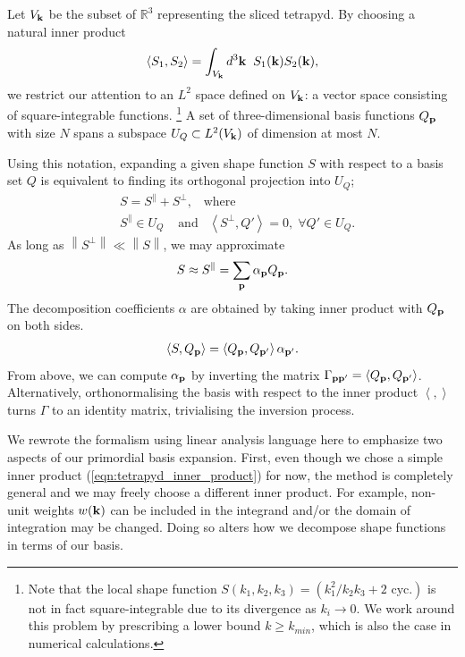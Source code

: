 Let $V_{\mathbf{k}}$ be the subset of $\mathbb{R}^3$ representing the sliced tetrapyd. By choosing a natural inner product
\begin{align}
	\left< S_1, S_2 \right> = \int_{V_{\mathbf{k}}} d^3\mathbf{k} \;\; S_1(\mathbf{k}) S_2(\mathbf{k}), \label{eqn:tetrapyd_inner_product}
\end{align}
we restrict our attention to an $L^2$ space defined on $V_{\mathbf{k}}$: a vector space consisting of square-integrable functions.
\footnote{Note that the local shape function $S(k_1,k_2,k_3) = (k_1^2 / k_2 k_3 + \text{2 cyc.})$ is not in fact square-integrable due to its divergence as $k_i \rightarrow 0$. We work around this problem by prescribing a lower bound $k \ge k_{min}$, which is also the case in numerical calculations.}
A set of three-dimensional basis functions $Q_{\mathbf{p}}$ with size $N$ spans a subspace $U_{Q} \subset L^2(V_{\mathbf{k}})$ of dimension at most $N$.

Using this notation, expanding a given shape function $S$ with respect to a basis set $Q$ is equivalent to finding its orthogonal projection into $U_{Q}$;
\begin{align}
	&S = S^{\parallel} + S^{\perp}, \;\;\;\text{where} \\
	&S^{\parallel} \in U_Q \;\;\;\;\text{and} \;\;\; \left< S^{\perp}, Q' \right> = 0, \; \forall Q' \in U_Q.
\end{align}
As long as $\left\| S^\perp \right\| \ll \left\| S \right\|$, we may approximate
\begin{align}
	S \approx S^\parallel = \sum_{\mathbf{p}} \alpha_{\mathbf{p}} Q_{\mathbf{p}}.  \label{eqn:primordial_basis_projection}
\end{align}
The decomposition coefficients $\alpha$ are obtained by taking inner product with $Q_{\mathbf{p}}$ on both sides.
\begin{align}
	\left< S, Q_\mathbf{p} \right> = \left< Q_\mathbf{p}, Q_{\mathbf{p}'} \right> \alpha_{\mathbf{p}'}. \label{eqn:primordial_basis_expansion_SQ_and_QQ}
\end{align}
From above, we can compute $\alpha_\mathbf{p}$ by inverting the matrix $\Gamma_{\mathbf{p} \mathbf{p}'} = \left< Q_\mathbf{p}, Q_{\mathbf{p}'} \right>$. Alternatively, orthonormalising the basis with respect to the inner product $\left< , \right>$ turns $\Gamma$ to an identity matrix, trivialising the inversion process.

We rewrote the formalism using linear analysis language here to emphasize two aspects of our primordial basis expansion. First, even though we chose a simple inner product (\ref{eqn:tetrapyd_inner_product}) for now, the method is completely general and we may freely choose a different inner product. For example, non-unit weights $w(\mathbf{k})$ can be included in the integrand and/or the domain of integration may be changed. Doing so alters how we decompose shape functions in terms of our basis.


